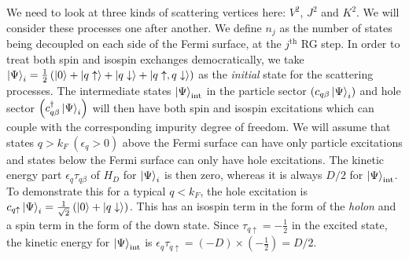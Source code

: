 \documentclass{report}
\numberwithin{equation}{section}
\begin{document}
\begin{appendices}
We need to look at three kinds of scattering vertices here: \(V^2\), \(J^2\) and \(K^2\). We will consider these processes one after another. We define \(n_j\) as the number of states being decoupled on each side of the Fermi surface, at the \(j^\text{th}\) RG step. In order to treat both spin and isospin exchanges democratically, we take \(\ket{\Psi}_i = \frac{1}{2}\left(\ket{0} + \ket{q\uparrow} + \ket{q\downarrow} + \ket{q\uparrow, q\downarrow}\right) \) as the \textit{initial} state for the scattering processes. The intermediate states \(\ket{\Psi}_\text{int}\) in the particle sector \(\left(c_{q\beta}\ket{\Psi}_i\right)\) and hole sector \(\left(c^\dagger_{q\beta}\ket{\Psi}_i\right)\) will then have both spin and isospin excitations which can couple with the corresponding impurity degree of freedom. We will assume that states  \(q > k_F~\left(\epsilon_q > 0\right) \) above the Fermi surface can have only particle excitations and states below the Fermi surface can only have hole excitations. The kinetic energy part \(\epsilon_q \tau_{q\beta}\) of \(H_D\) for \(\ket{\Psi}_i\) is then zero, whereas it is always \(D/2\) for \(\ket{\Psi}_\text{int}\). To demonstrate this for a typical \(q < k_F\), the hole excitation is \(c_{q \uparrow}\ket{\Psi}_i = \frac{1}{\sqrt 2}\left(\ket{0} + \ket{q \downarrow}\right)\). This has an isospin term in the form of the \textit{holon} and a spin term in the form of the down state. Since \(\tau_{q \uparrow} = -\frac{1}{2}\) in the excited state, the kinetic energy for \(\ket{\Psi}_\text{int}\) is \(\epsilon_q \tau_{q \uparrow} = \left(-D\right)\times\left(-\frac{1}{2}\right) = D/2\).


\end{appendices}
\end{document}
